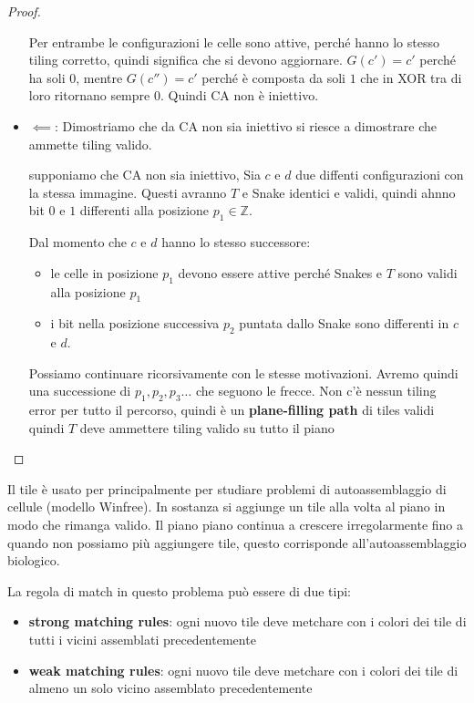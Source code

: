 \begin{teorema}
\begin{proof}
\begin{itemize}
            Per entrambe le configurazioni le celle sono attive, perché 
            hanno lo stesso tiling corretto, quindi significa che si devono aggiornare.
            $G(c') = c'$ perché ha soli $0$, mentre $G(c'') = c'$ perché è composta 
            da soli $1$ che in XOR tra di loro ritornano sempre $0$. Quindi CA non 
            è iniettivo.
            \item $\impliedby$: Dimostriamo che da CA non sia iniettivo si riesce 
            a dimostrare che ammette tiling valido.
                        
            supponiamo che CA non sia iniettivo, Sia $c$ e $d$
            due diffenti configurazioni con la stessa immagine. Questi 
            avranno $T$ e Snake identici e validi, quindi ahnno bit $0$ e $1$ differenti
            alla posizione $p_1\in \mathbb{Z}$.

            Dal momento che $c$ e $d$ hanno lo stesso successore:
            \begin{itemize}
                \item le celle in posizione $p_1$ devono essere attive perché
                Snakes e $T$ sono validi alla posizione $p_1$
                \item i bit nella posizione successiva $p_2$ puntata dallo Snake
                sono differenti in $c$ e $d$.
            \end{itemize}
            Possiamo continuare ricorsivamente con le stesse motivazioni.
            Avremo quindi una successione di $p_1,p_2,p_3\dots$ che seguono le 
            frecce. Non c'è nessun tiling error per tutto il percorso, quindi 
            è un \textbf{plane-filling path} di tiles validi quindi $T$ deve 
            ammettere tiling valido su tutto il piano
        \end{itemize}
    \end{proof}
\end{teorema}

Il tile è usato per principalmente per studiare problemi di autoassemblaggio di 
cellule (modello Winfree). In sostanza si aggiunge un tile alla volta al piano in modo che rimanga 
valido. Il piano piano continua a crescere irregolarmente fino a quando non possiamo 
più aggiungere tile, questo corrisponde all'autoassemblaggio biologico.

La regola di match in questo problema può essere di due tipi:
\begin{itemize}
    \item \textbf{strong matching rules}: ogni nuovo tile deve metchare con i colori 
    dei tile di tutti i vicini assemblati precedentemente
    \item \textbf{weak matching rules}: ogni nuovo tile deve metchare con i colori 
    dei tile di almeno un solo vicino assemblato precedentemente
\end{itemize}

